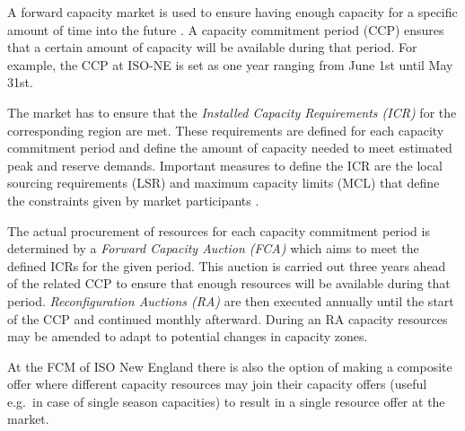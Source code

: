 A forward capacity market is used to ensure having enough capacity for a specific amount of time into the future \cite{gottstein2010role}. A capacity commitment period (CCP) ensures that a certain amount of capacity will be available during that period. For example, the CCP at ISO-NE is set as one year ranging from June 1st until May 31st. 

The market has to ensure that the \emph{Installed Capacity Requirements (ICR)} for the corresponding region are met. These requirements are defined for each capacity commitment period and define the amount of capacity needed to meet estimated peak and reserve demands. Important measures to define the ICR are the local sourcing requirements (LSR) and maximum capacity limits (MCL) that define the constraints given by market participants \cite{gottstein2010role}. 

The actual procurement of resources for each capacity commitment period is determined by a \emph{Forward Capacity Auction (FCA)} which aims to meet the defined ICRs for the given period.
This auction is carried out three years ahead of the related CCP to ensure that enough resources will be available during that period. \emph{Reconfiguration Auctions (RA)} are then executed annually until the start of the CCP and continued monthly afterward. During an RA capacity resources may be amended to adapt to potential changes in capacity zones. 

At the FCM of ISO New England there is also the option of making a composite offer where different capacity resources may join their capacity offers (useful e.g.~in case of single season capacities) to result in a single resource offer at the market. 



%
%



